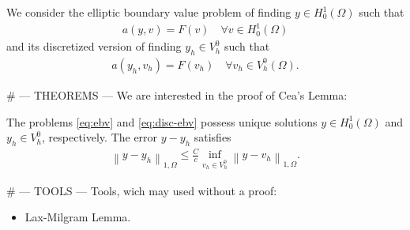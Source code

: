 We consider the elliptic boundary value problem of finding \(y \in H^1_0(\Omega)\) such that
%
\begin{gather}\label{eq:ebv}
    a\left(y,v\right) = F(v) \quad \forall v \in H^1_0(\Omega)
\end{gather}
%
and its discretized version of finding \(y_h \in V^0_h\) such that
%
\begin{gather*}\label{eq:disc-ebv}
    a\left(y_h,v_h\right) = F(v_h) \quad \forall v_h \in V^0_h(\Omega).
\end{gather*}
%

# --- THEOREMS ---
We are interested in the proof of Cea's Lemma:
%
\begin{theorem}
    The problems \eqref{eq:ebv} and \eqref{eq:disc-ebv} possess unique solutions \(y \in H^1_0(\Omega)\) and \(y_h \in V^0_h\), respectively. 
    The error \(y-y_h\) satisfies
    \begin{gather*}
        \left\|y-y_h\right\|_{1,\Omega} \leq \frac{C}{c} \inf_{v_h \in V^0_h} \left\|y-v_h\right\|_{1,\Omega}.
    \end{gather*}
\end{theorem}
%

# --- TOOLS ---
Tools, wich may used without a proof:
%
\begin{itemize}
    \item Lax-Milgram Lemma.
\end{itemize}